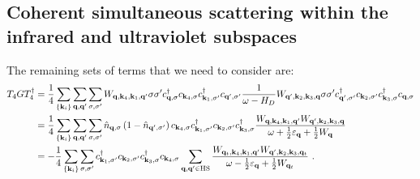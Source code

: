 \documentclass{revtex4-2}
\begin{document}
\subsection{Coherent simultaneous scattering within the infrared and ultraviolet subspaces}
The remaining sets of terms that we need to consider are:
\begin{equation}\begin{aligned}
	T_4 G T_4^\dagger &= \frac{1}{4}\sum_{\left\{ {\bf k}_i \right\} }\sum_{{\bf q},{\bf q}^\prime}\sum_{\sigma,\sigma^\prime}  W_{{\bf q},{\bf k}_4, {\bf k}_1, {\bf q}^\prime} \sigma\sigma^\prime c^\dagger_{{\bf q},\sigma}c_{{\bf k}_4,\sigma}c^\dagger_{{\bf k}_1,\sigma^\prime}c_{{\bf q}^\prime,\sigma^\prime} \frac{1}{\omega - H_D}W_{{\bf q}^\prime, {\bf k}_2, {\bf k}_3, {\bf q}} \sigma\sigma^\prime c^\dagger_{{\bf q}^\prime,\sigma^\prime}c_{{\bf k}_2,\sigma^\prime}c^\dagger_{{\bf k}_3,\sigma}c_{{\bf q},\sigma}\\
		  &= \frac{1}{4}\sum_{\left\{ {\bf k}_i \right\} }\sum_{{\bf q},{\bf q}^\prime}\sum_{\sigma,\sigma^\prime} \hat n_{{\bf q},\sigma} \left(1 - \hat n_{{\bf q}^\prime,\sigma^\prime}\right) c_{{\bf k}_4,\sigma}c^\dagger_{{\bf k}_1,\sigma^\prime}c_{{\bf k}_2,\sigma^\prime}c^\dagger_{{\bf k}_3,\sigma} \frac{W_{{\bf q},{\bf k}_4, {\bf k}_1, {\bf q}^\prime} W_{{\bf q}^\prime, {\bf k}_2, {\bf k}_3, {\bf q}}}{\omega + \frac{1}{2}\varepsilon_{{\bf q}}  + \frac{1}{2}W_{{\bf q}}}  \\
		  &= -\frac{1}{4}\sum_{\left\{ {\bf k}_i \right\} }\sum_{\sigma,\sigma^\prime} c^\dagger_{{\bf k}_1,\sigma^\prime}c_{{\bf k}_2,\sigma^\prime}c^\dagger_{{\bf k}_3,\sigma}c_{{\bf k}_4,\sigma} \sum_{{\bf q}, {\bf q}^\prime \in \text{HS}}\frac{W_{{\bf q}_t,{\bf k}_4, {\bf k}_1, {\bf q}^\prime} W_{{\bf q}^\prime, {\bf k}_2, {\bf k}_3, {\bf q}_t}}{\omega - \frac{1}{2}\varepsilon_{{\bf q}}  + \frac{1}{2}W_{{\bf q}_t}}~.
\end{aligned}\end{equation}
\end{document}
